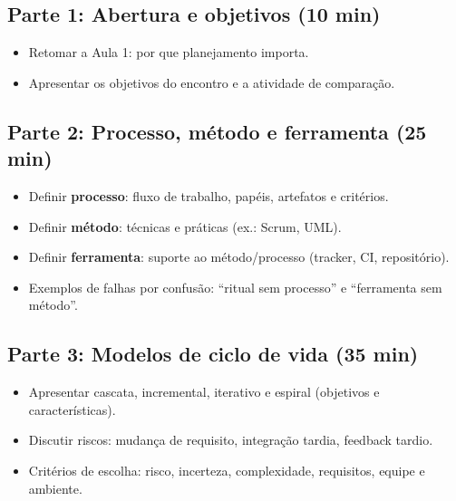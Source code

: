 \documentclass[12pt,a4paper]{article}
\begin{document}
\subsection*{Parte 1: Abertura e objetivos (10 min)}
\begin{itemize}[leftmargin=*,itemsep=0.35em]
  \item Retomar a Aula 1: por que planejamento importa.
  \item Apresentar os objetivos do encontro e a atividade de comparação.
\end{itemize}

\subsection*{Parte 2: Processo, método e ferramenta (25 min)}
\begin{itemize}[leftmargin=*,itemsep=0.35em]
  \item Definir \textbf{processo}: fluxo de trabalho, papéis, artefatos e critérios.
  \item Definir \textbf{método}: técnicas e práticas (ex.: Scrum, UML).
  \item Definir \textbf{ferramenta}: suporte ao método/processo (tracker, CI, repositório).
  \item Exemplos de falhas por confusão: ``ritual sem processo'' e ``ferramenta sem método''.
\end{itemize}

\subsection*{Parte 3: Modelos de ciclo de vida (35 min)}
\begin{itemize}[leftmargin=*,itemsep=0.35em]
  \item Apresentar cascata, incremental, iterativo e espiral (objetivos e características).
  \item Discutir riscos: mudança de requisito, integração tardia, feedback tardio.
  \item Critérios de escolha: risco, incerteza, complexidade, requisitos, equipe e ambiente.
\end{itemize}
\end{document}
